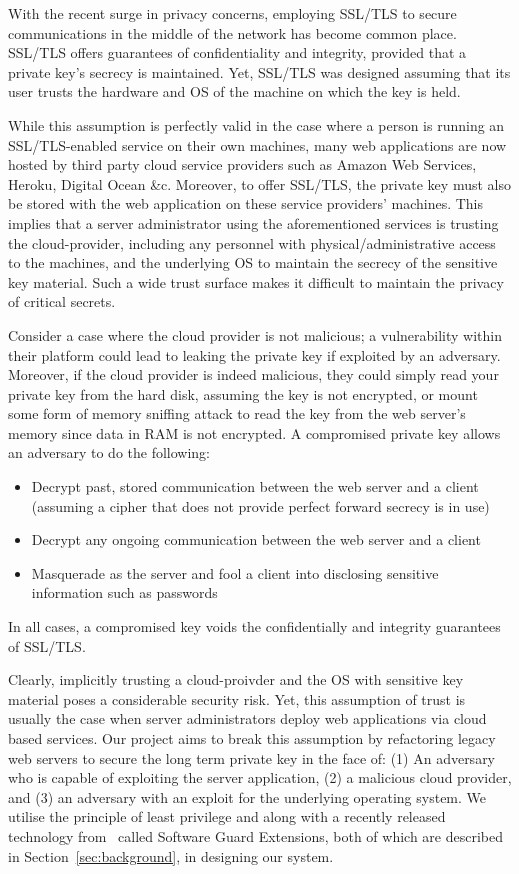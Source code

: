 \documentclass[../main.tex]{subfiles}
\begin{document}
With the recent surge in privacy concerns, employing SSL/TLS to secure
communications in the middle of the network has become common
place. SSL/TLS offers guarantees of confidentiality and integrity,
provided that a private key's secrecy is maintained. Yet, SSL/TLS was
designed assuming that its user trusts the hardware and OS of the
machine on which the key is held.
 
While this assumption is perfectly valid in the case where a person is
running an SSL/TLS-enabled service on their own machines, many web
applications are now hosted by third party cloud service providers
such as Amazon Web Services, Heroku, Digital Ocean \&c. Moreover, to
offer SSL/TLS, the private key must also be stored with the web
application on these service providers' machines. This implies that a
server administrator using the aforementioned services is trusting the
cloud-provider, including any personnel with physical/administrative
access to the machines, and the underlying OS to maintain the secrecy
of the sensitive key material. Such a wide trust surface makes it
difficult to maintain the privacy of critical secrets.

Consider a case where the cloud provider is not malicious; a
vulnerability within their platform could lead to leaking the private
key if exploited by an adversary. Moreover, if the cloud provider is
indeed malicious, they could simply read your private key from the hard
disk, assuming the key is not encrypted, or mount some form of memory
sniffing attack to read the key from the web server's memory since
data in RAM is not encrypted. A compromised private key allows an
adversary to do the following:
\begin{itemize}
  \item Decrypt past, stored communication between the web server and a
    client (assuming a cipher that does not provide perfect forward
    secrecy is in use)
  \item Decrypt any ongoing communication between the web server and a
    client
  \item Masquerade as the server and fool a client into disclosing
    sensitive information such as passwords
\end{itemize}
In all cases, a compromised key voids the confidentially and integrity
guarantees of SSL/TLS.

Clearly, implicitly trusting a cloud-proivder and the OS with
sensitive key material poses a considerable security risk. Yet, this
assumption of trust is usually the case when server administrators
deploy web applications via cloud based services. Our project aims to
break this assumption by refactoring legacy web servers to secure the
long term private key in the face of: (1) An adversary who is capable
of exploiting the server application, (2) a malicious cloud provider,
and (3) an adversary with an exploit for the underlying operating
system. We utilise the principle of least privilege and along with a
recently released technology from \Intel~called Software Guard
Extensions, both of which are described in
Section~\ref{sec:background}, in designing our system.
\end{document}
